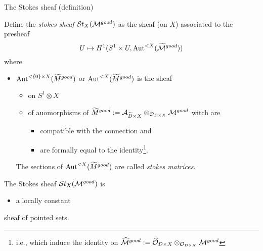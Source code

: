 \begin{frame}[t]{The Stokes sheaf (definition)}
  \begin{defn}
    Define the \emph{stokes sheaf} $\mathcal{S}{}t_X(\mathcal{M}^{good})$ as the sheaf (on $X$)
    associated to the presheaf
    \[
      U\mapsto H^1(S^1\times U,\operatorname{Aut}^{<X}(\widetilde {\mathcal{M}}^{good}) )
    \]
    where
    \begin{itemize}
      \item $\operatorname{Aut}^{<\{0\}\times X}(\widetilde M^{good})$ or
        $\operatorname{Aut}^{<X}(\widetilde M^{good})$ is the sheaf
        \begin{itemize}
          \item on $S^1\otimes X$
          \item of auomorphisms of $\widetilde M^{good}:=\mathcal{A}_{\widetilde D\times
            X}\otimes_{\mathcal{O}_{D\times X}}\mathcal{M}^{good}$
            witch are
            \begin{itemize}
              \item compatible with the connection and
              \item are formally equal to the identity\footnote{i.e., which
                induce the identity on $\widehat {\mathcal{M}}^{good}:=\widehat {\mathcal{O}}_{D\times
                X}\otimes_{\mathcal{O}_{D\times X}}\mathcal{M}^{good}$}.
            \end{itemize}
        \end{itemize}
        The sections of $\operatorname{Aut}^{<X}(\widetilde M^{good})$ are called \emph{stokes
        matrices}.
    \end{itemize}
  \end{defn}
  \begin{thm}
    The Stokes sheaf $\mathcal{S}{}t_X(\mathcal{M}^{good})$ is
    \begin{itemize}
      \item a locally constant
    \end{itemize}
    sheaf of pointed sets.
  \end{thm}
\end{frame}

